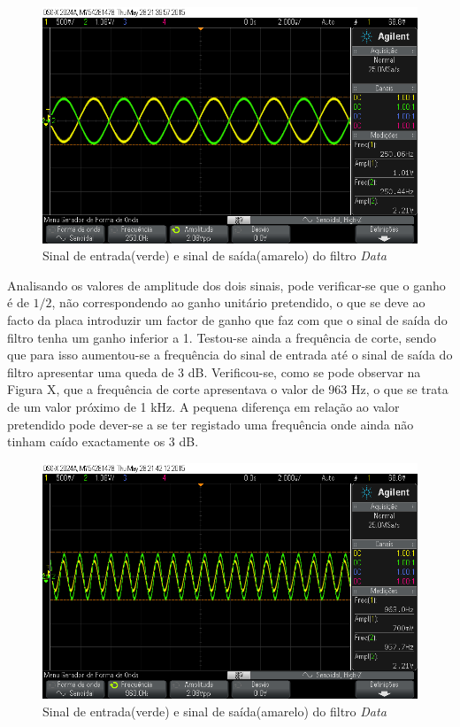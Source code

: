 \documentclass[11pt]{article}
\numberwithin{equation}{section}
\begin{document}
\begin{figure}[H]
	\centering
	\includegraphics[keepaspectratio=true, scale=0.50]{exps/filtro_1k_baixafreq}
	\caption{Sinal de entrada(verde) e sinal de saída(amarelo) do filtro \textit{Data}}
	\label{fig:fluxo}
	\vspace{-0.8em}
\end{figure} 

Analisando os valores de amplitude dos dois sinais, pode verificar-se que o ganho é de $1/2$, não correspondendo ao ganho unitário pretendido, o que se deve ao facto da placa introduzir um factor de ganho que faz com que o sinal de saída do filtro tenha um ganho inferior a 1. 
Testou-se ainda a frequência de corte, sendo que para isso aumentou-se a frequência do sinal de entrada até o sinal de saída do filtro apresentar uma queda de 3 dB. Verificou-se, como se pode observar na Figura X, que a frequência de corte apresentava o valor de 963 Hz, o que se trata de um valor próximo de 1 kHz. A pequena diferença em relação ao valor pretendido pode dever-se a se ter registado uma frequência onde ainda não tinham caído exactamente os 3 dB.

\begin{figure}[H]
	\centering
	\includegraphics[keepaspectratio=true, scale=0.50]{exps/filtro_1k_freqcorte}
	\caption{Sinal de entrada(verde) e sinal de saída(amarelo) do filtro \textit{Data}}
	\label{fig:fluxo}
	\vspace{-0.8em}
\end{figure} 
\end{document}

